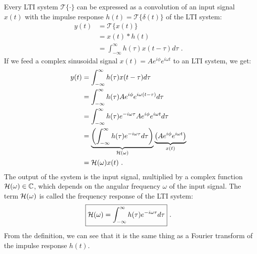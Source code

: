 Every LTI system $\mathcal{T}\{\cdot\}$ can be expressed as a
convolution of an input signal $x(t)$ with the impulse response $h(t)=\mathcal{T}\{\delta(t)\}$
of the LTI system:
\begin{align}
y(t) &= \mathcal{T}\{x(t)\}\\
&= x(t)*h(t) \\
&=\int_{-\infty}^{\infty} h(\tau) x(t-\tau) d\tau \,\,.
\end{align}
If we feed a complex sinusoidal signal $x(t)=Ae^{i\phi}e^{i\omega t}$
to an LTI system, we get:
\begin{align}
y(t) & = \int_{-\infty}^{\infty} h(\tau)x(t-\tau) d\tau \\
     & = \int_{-\infty}^{\infty} h(\tau) A e^{i\phi} e^{i\omega(t-\tau)}  d\tau \\
     & = \int_{-\infty}^{\infty}h(\tau) e^{-i \omega \tau} A e^{i\phi} e^{i \omega t } d\tau \\
     & = \underbrace{\left(\int_{-\infty}^{\infty} h(\tau) e^{-i \omega \tau} d\tau\right)}_{\mathcal{H}(\omega)} \underbrace{\left(A e^{i\phi} e^{i \omega t}\right)}_{x(t)} \\
     & = \mathcal{H}(\omega) x(t) \,\,. \label{eq:eig_ct}
\end{align}
The output of the system is the input signal, multiplied by a complex
function $\mathcal{H}(\omega) \in \mathbb{C}$, which depends on the angular frequency
$\omega$ of the input signal. The term $\mathcal{H}(\omega)$ is called the frequency
response of the LTI system:
\begin{equation}
\boxed{
\mathcal{H}(\omega) = \int_{-\infty}^{\infty} h(\tau) e^{-i \omega \tau} d\tau
} \,\,.
\label{eq:fresp_ct}
\end{equation}
From the definition, we can see that it is the same thing as a Fourier
transform of the impulse response $h(t)$.


